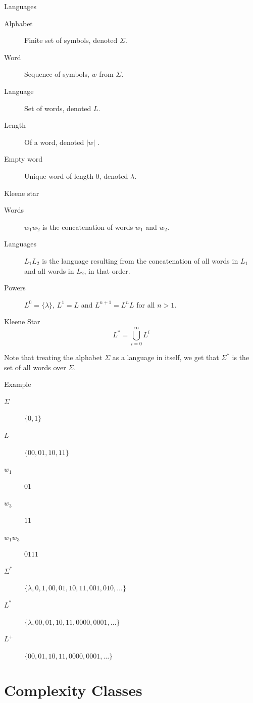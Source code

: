 \begin{frame}{Languages}
  \begin{description}
    \item[Alphabet] Finite set of symbols, denoted $\Sigma$.
    \item[Word] Sequence of symbols, $w$ from $\Sigma$.
    \item[Language] Set of words, denoted $L$.
    \item[Length] Of a word, denoted $|w|$  .
    \item[Empty word] Unique word of length 0, denoted $\lambda$.
  \end{description}
\end{frame}

\begin{frame}{Kleene star}
  \begin{description}
    \item[Words] $w_1 w_2$ is the concatenation of words $w_1$ and $w_2$.
    \item[Languages] $L_1 L_2$ is the language resulting from the concatenation of all words in $L_1$ and all words in $L_2$, in that order.
    \item[Powers] $L^0 = \{ \lambda \}$, $L^1 = L$ and $L^{n+1} = L^n L$ for all $n > 1$.
  \end{description}
  
  \vspace{0.5cm}
  
  \begin{block}{Kleene Star}
     \[ L^* =  \bigcup_{i=0}^{\infty} L^i \]
  \end{block}
  
  Note that treating the alphabet $\Sigma$ as a language in itself, we get that $\Sigma^*$ is the set of all words over $\Sigma$.
\end{frame}

\begin{frame}{Example}
  \begin{description}
    \item[$\Sigma$] $\{ 0, 1 \}$
    \item[$L$] $\{ 00, 01, 10, 11 \}$
    \item[$w_1$] $01$
    \item[$w_3$] $11$
    \item[$w_1 w_3$] $0111$
    \item[$\Sigma^*$] $\{ \lambda, 0, 1, 00, 01, 10, 11, 001, 010, \ldots \}$
    \item[$L^*$] $\{ \lambda, 00, 01, 10, 11, 0000, 0001, \ldots \}$
    \item[$L^+$] $\{ 00, 01, 10, 11, 0000, 0001, \ldots \}$
  \end{description}
\end{frame}

\section{Complexity Classes}
